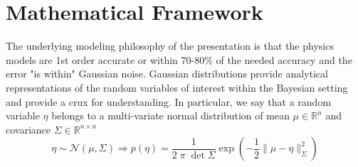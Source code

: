 \documentclass[10pt]{amsart}
\begin{document}
\section{Mathematical Framework}\label{GeneralMathFramework}

The underlying modeling philosophy of the presentation is that the physics 
models are 1st order accurate or within 70-80\% of the needed accuracy and the error "is
within" Gaussian noise.
Gaussian distributions provide analytical representations of the random
variables of interest within the Bayesian setting and 
provide a crux for understanding. In particular, we say that a random
variable $\eta$ belongs to a multi-variate normal distribution 
of mean $\mu \in \mathbb{R}^n $ and covariance $\Sigma \in \mathbb{R}^{n \times n}$
\[
     \eta \sim \mathcal{N}(\mu,\Sigma)  
    \Rightarrow
      p(\eta)  = \frac{1}{2 \; \pi \; \det{\Sigma}} \exp\left( - \frac{1}{2} \| \mu - \eta\|^2_{\Sigma}\right)
\]
\end{document}
